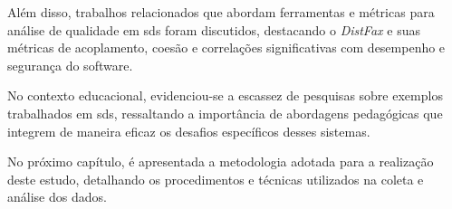 Além disso, trabalhos relacionados que abordam ferramentas e métricas para análise de qualidade em \gls{sds} foram discutidos, destacando o \textit{DistFax} e suas métricas de acoplamento, coesão e correlações significativas com desempenho e segurança do software.

No contexto educacional, evidenciou-se a escassez de pesquisas sobre exemplos trabalhados em \gls{sds}, ressaltando a importância de abordagens pedagógicas que integrem de maneira eficaz os desafios específicos desses sistemas.

No próximo capítulo, é apresentada a metodologia adotada para a realização deste estudo, detalhando os procedimentos e técnicas utilizados na coleta e análise dos dados.
